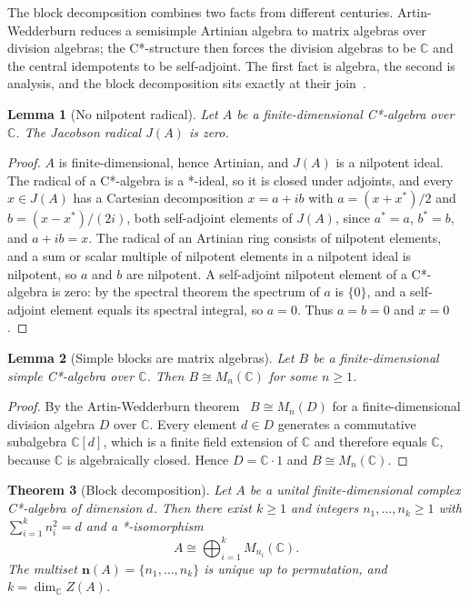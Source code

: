 \documentclass[11pt,letterpaper]{article}
\newtheorem{theorem}{Theorem}[section]
\newtheorem{lemma}[theorem]{Lemma}
\theoremstyle{definition}
\theoremstyle{remark}
\begin{document}
The block decomposition combines two facts from different centuries. Artin-Wedderburn reduces a semisimple Artinian algebra to matrix algebras over division algebras; the C*-structure then forces the division algebras to be $\mathbb{C}$ and the central idempotents to be self-adjoint. The first fact is algebra, the second is analysis, and the block decomposition sits exactly at their join~\cite{murphy}.

\begin{lemma}[No nilpotent radical]
\label{lem:radical}
Let $A$ be a finite-dimensional C*-algebra over $\mathbb{C}$. The Jacobson radical $J(A)$ is zero.
\end{lemma}

\begin{proof}
$A$ is finite-dimensional, hence Artinian, and $J(A)$ is a nilpotent ideal. The radical of a C*-algebra is a *-ideal, so it is closed under adjoints, and every $x \in J(A)$ has a Cartesian decomposition $x = a + ib$ with $a = (x + x^*)/2$ and $b = (x - x^*)/(2i)$, both self-adjoint elements of $J(A)$, since $a^* = a$, $b^* = b$, and $a + ib = x$. The radical of an Artinian ring consists of nilpotent elements, and a sum or scalar multiple of nilpotent elements in a nilpotent ideal is nilpotent, so $a$ and $b$ are nilpotent. A self-adjoint nilpotent element of a C*-algebra is zero: by the spectral theorem the spectrum of $a$ is $\{0\}$, and a self-adjoint element equals its spectral integral, so $a = 0$. Thus $a = b = 0$ and $x = 0$.
\end{proof}

\begin{lemma}[Simple blocks are matrix algebras]
\label{lem:simple-blocks}
Let $B$ be a finite-dimensional simple C*-algebra over $\mathbb{C}$. Then $B \cong M_n(\mathbb{C})$ for some $n \geq 1$.
\end{lemma}

\begin{proof}
By the Artin-Wedderburn theorem~\cite{murphy} $B \cong M_n(D)$ for a finite-dimensional division algebra $D$ over $\mathbb{C}$. Every element $d \in D$ generates a commutative subalgebra $\mathbb{C}[d]$, which is a finite field extension of $\mathbb{C}$ and therefore equals $\mathbb{C}$, because $\mathbb{C}$ is algebraically closed. Hence $D = \mathbb{C} \cdot 1$ and $B \cong M_n(\mathbb{C})$.
\end{proof}

\begin{theorem}[Block decomposition]
\label{thm:block-decomposition}
Let $A$ be a unital finite-dimensional complex C*-algebra of dimension $d$. Then there exist $k \geq 1$ and integers $n_1, \dots, n_k \geq 1$ with $\sum_{i=1}^{k} n_i^2 = d$ and a *-isomorphism
\[
A \cong \bigoplus_{i=1}^{k} M_{n_i}(\mathbb{C}).
\]
The multiset $\mathbf{n}(A) = \{n_1, \dots, n_k\}$ is unique up to permutation, and $k = \dim_{\mathbb{C}} Z(A)$.
\end{theorem}
\end{document}

